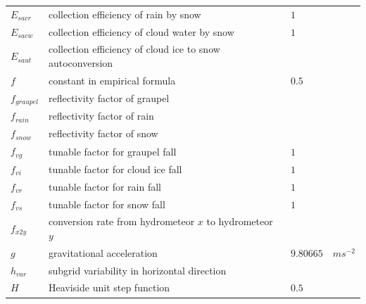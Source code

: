 \documentclass[letterpaper,titlepage,10pt]{article}
\numberwithin{equation}{section}
\begin{document}
\begin{appendices}
\begin{longtable}{p{}p{}p{}p{}}
	$E_{sacr}$         & collection efficiency of rain by snow                                                & $1$                        & \\
	$E_{sacw}$         & collection efficiency of cloud water by snow                                         & $1$                        & \\
	$E_{saut}$         & collection efficiency of cloud ice to snow autoconversion                            &                            & \\
	$f$                & constant in empirical formula                                                        & $0.5$                      & \\
	$f_{graupel}$      & reflectivity factor of graupel                                                       &                            & \\
	$f_{rain}$         & reflectivity factor of rain                                                          &                            & \\
	$f_{snow}$         & reflectivity factor of snow                                                          &                            & \\
	$f_{vg}$           & tunable factor for graupel fall                                                      & $1$                        & \\
	$f_{vi}$           & tunable factor for cloud ice fall                                                    & $1$                        & \\
	$f_{vr}$           & tunable factor for rain fall                                                         & $1$                        & \\
	$f_{vs}$           & tunable factor for snow fall                                                         & $1$                        & \\
	$f_{x2y}$          & conversion rate from hydrometeor $x$ to hydrometeor $y$                              &                            & \\
	$g$                & gravitational acceleration                                                           & $9.80665$                  & $m s^{-2}$ \\
	$h_{var}$          & subgrid variability in horizontal direction                                          &                            & \\
	$H$                & Heaviside unit step function                                                         & $0.5$                      & \\

\end{longtable}
\end{appendices}
\end{document}
